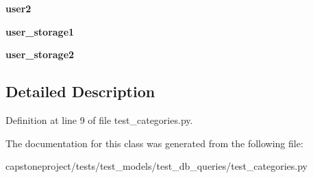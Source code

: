 \begin{DoxyCompactItemize}
\mbox{\label{classcapstoneproject_1_1tests_1_1test__models_1_1test__db__queries_1_1test__categories_1_1_categories_test_class_a91f5dffc9d44eb085453483c16de1b07}} 
{\bfseries user2}
\item 
\mbox{\label{classcapstoneproject_1_1tests_1_1test__models_1_1test__db__queries_1_1test__categories_1_1_categories_test_class_aab186bd162eb732303764506b9f4609d}} 
{\bfseries user\+\_\+storage1}
\item 
\mbox{\label{classcapstoneproject_1_1tests_1_1test__models_1_1test__db__queries_1_1test__categories_1_1_categories_test_class_a9d2947c05ed493792ea66709bded6159}} 
{\bfseries user\+\_\+storage2}
\end{DoxyCompactItemize}


\subsection{Detailed Description}


Definition at line 9 of file test\+\_\+categories.\+py.



The documentation for this class was generated from the following file\+:\begin{DoxyCompactItemize}
\item 
capstoneproject/tests/test\+\_\+models/test\+\_\+db\+\_\+queries/test\+\_\+categories.\+py\end{DoxyCompactItemize}
